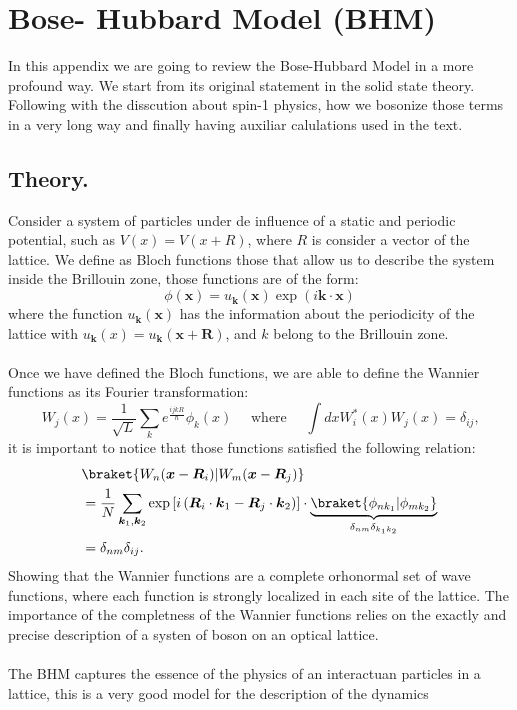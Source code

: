 \chapter{Bose- Hubbard Model (BHM)}
In this appendix we are going to review the Bose-Hubbard Model in a more profound way. We start from its original statement in the solid state theory. Following with the disscution about spin-1 physics, how we bosonize those terms in a very long way and finally having auxiliar calulations used in the text.

\section{Theory.} \label{App_B_Theory}
Consider a system of particles under de influence of a static and periodic potential, such as $V(x)=V(x+R)$, where $R$ is consider a vector of the lattice. We define as Bloch functions those that allow us to describe the system inside the Brillouin zone, those functions are of the form:
\begin{equation}
    \phi(\boldsymbol{x})=u_{\boldsymbol{k}}(\boldsymbol{x}) \exp (i \boldsymbol{k} \cdot \boldsymbol{x}) 
\end{equation}
where the function $u_{\boldsymbol{k}}(\boldsymbol{x})$ has the information about the periodicity of the lattice with $u_{\boldsymbol{k}}(x) = u_{\boldsymbol{k}} (\boldsymbol{x+R}) $, and $k$ belong to the Brillouin zone.\\ \\
Once we have defined the Bloch functions, we are able to define the Wannier functions as its Fourier transformation:
\begin{equation} \label{wannier}
    W_j(x)=\frac{1}{\sqrt{L}} \sum_k e^{\frac{i j k R}{\hbar}} \phi_k(x) \quad \text { where } \quad \int d x W_i^*(x) W_j(x)=\delta_{i j} \text {,}
\end{equation}
it is important to notice that those functions satisfied the following relation:
\begin{equation}
\begin{aligned} \label{wannier2}
&\braket{W_n (\boldsymbol{x}-\boldsymbol{R}_i) | W_m (\boldsymbol{x}-\boldsymbol{R}_j)} \\
&= \frac{1}{N} \sum_{\boldsymbol{k}_1, \boldsymbol{k}_2} \exp \left[ i \left( \boldsymbol{R}_i \cdot \boldsymbol{k}_1 - \boldsymbol{R}_j \cdot \boldsymbol{k}_2 \right) \right] \cdot \underbrace{ \braket{\phi_{n k_1} | \phi_{m k_2}} }_{\delta_{n m} \delta_{k_1 k_2}} \\
&= \delta_{n m} \delta_{i j} \text{.}
\end{aligned}
\end{equation}
Showing that the Wannier functions are a complete orhonormal set of wave functions, where each function is strongly localized in each site of the lattice. The importance of the completness of the Wannier functions relies on the exactly and precise description of a systen of boson on an optical lattice. \\ \\
The BHM captures the essence of the physics of an interactuan particles in a lattice, this is a very good model for the description of the dynamics 


